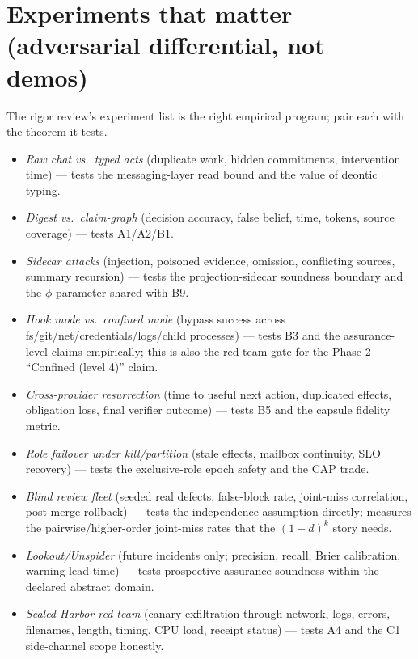 \documentclass[11pt,a4paper]{article}
\begin{document}
\section{Experiments that matter (adversarial differential, not demos)}
The rigor review's experiment list is the right empirical program; pair each with the theorem it tests.
\begin{itemize}
\item \emph{Raw chat vs.\ typed acts} (duplicate work, hidden commitments, intervention time) --- tests the messaging-layer read bound and the value of deontic typing.
\item \emph{Digest vs.\ claim-graph} (decision accuracy, false belief, time, tokens, source coverage) --- tests A1/A2/B1.
\item \emph{Sidecar attacks} (injection, poisoned evidence, omission, conflicting sources, summary recursion) --- tests the projection-sidecar soundness boundary and the $\phi$-parameter shared with B9.
\item \emph{Hook mode vs.\ confined mode} (bypass success across fs/git/net/credentials/logs/child processes) --- tests B3 and the assurance-level claims empirically; this is also the red-team gate for the Phase-2 ``Confined (level 4)'' claim.
\item \emph{Cross-provider resurrection} (time to useful next action, duplicated effects, obligation loss, final verifier outcome) --- tests B5 and the capsule fidelity metric.
\item \emph{Role failover under kill/partition} (stale effects, mailbox continuity, SLO recovery) --- tests the exclusive-role epoch safety and the CAP trade.
\item \emph{Blind review fleet} (seeded real defects, false-block rate, joint-miss correlation, post-merge rollback) --- tests the independence assumption directly; measures the pairwise/higher-order joint-miss rates that the $(1-d)^k$ story needs.
\item \emph{Lookout/Unspider} (future incidents only; precision, recall, Brier calibration, warning lead time) --- tests prospective-assurance soundness within the declared abstract domain.
\item \emph{Sealed-Harbor red team} (canary exfiltration through network, logs, errors, filenames, length, timing, CPU load, receipt status) --- tests A4 and the C1 side-channel scope honestly.
\end{itemize}
\end{document}
